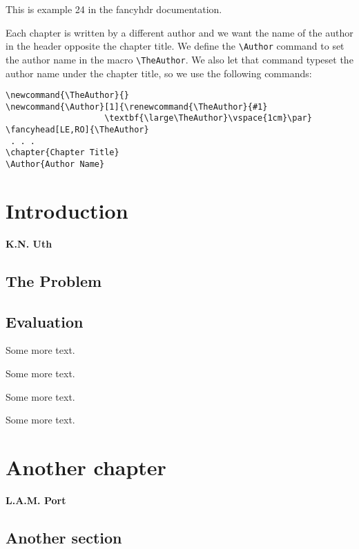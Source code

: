\documentclass[openany]{book}
\newcommand{\TheAuthor}{}
\newcommand{\Author}[1]{\renewcommand{\TheAuthor}{#1}\textbf{\large\TheAuthor}\vspace{1cm}\par}
\begin{document}
\tableofcontents
\bigskip

\noindent
\begin{boxedminipage}{\textwidth}
This is example 24 in the fancyhdr documentation.

Each chapter is written by a different author
and we want the name of the author in the header opposite the chapter
title. We define the \verb|\Author| command to set the author name in the macro \verb|\TheAuthor|.
We also let that command typeset the author name under the chapter title, so we use the following commands:

\begin{verbatim}
\newcommand{\TheAuthor}{}
\newcommand{\Author}[1]{\renewcommand{\TheAuthor}{#1}
                    \textbf{\large\TheAuthor}\vspace{1cm}\par}
\fancyhead[LE,RO]{\TheAuthor}
 . . .
\chapter{Chapter Title}
\Author{Author Name}
\end{verbatim}
\end{boxedminipage}

\newpage
{}
\chapter{Introduction}
\Author{K.N. Uth}
\lipsum

\section{The Problem}
\label{sec:problem}

\lipsum[1]

\section{Evaluation}

\lipsum

Some more text.

Some more text.

Some more text.

Some more text.

\chapter{Another chapter}
\Author{L.A.M. Port}
\label{cha:another-chapter}

\lipsum[2]

\section{Another section}

\lipsum[3-5]
\end{document}
